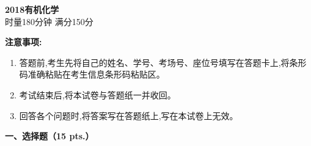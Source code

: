 \begin{center}
    {\LARGE \textbf{2018有机化学}} \\[2ex]
    {\large 时量180分钟 \quad 满分150分}
\end{center}

\vspace{0.5cm}
\noindent\textbf{注意事项:}
\begin{enumerate}[label=\arabic*., parsep=0pt, itemsep=0pt]
    \item 答题前,考生先将自己的姓名、学号、考场号、座位号填写在答题卡上,将条形码准确粘贴在考生信息条形码粘贴区。
    \item 考试结束后,将本试卷与答题纸一并收回。
    \item 回答各个问题时,将答案写在答题纸上,写在本试卷上无效。
\end{enumerate}

\vspace{0.5cm}
\noindent\textbf{一、选择题（15 pts.）}

